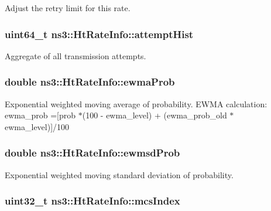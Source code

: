 Adjust the retry limit for this rate. 

\subsubsection[{\texorpdfstring{attempt\+Hist}{attemptHist}}]{\setlength{\rightskip}{0pt plus 5cm}uint64\+\_\+t ns3\+::\+Ht\+Rate\+Info\+::attempt\+Hist}\hypertarget{structns3_1_1HtRateInfo_aa96f3d46e3b1fcd1fae461138a8adb3a}{}\label{structns3_1_1HtRateInfo_aa96f3d46e3b1fcd1fae461138a8adb3a}


Aggregate of all transmission attempts. 

\subsubsection[{\texorpdfstring{ewma\+Prob}{ewmaProb}}]{\setlength{\rightskip}{0pt plus 5cm}double ns3\+::\+Ht\+Rate\+Info\+::ewma\+Prob}\hypertarget{structns3_1_1HtRateInfo_a9199564f7081a66b86dd8bedc0d22e58}{}\label{structns3_1_1HtRateInfo_a9199564f7081a66b86dd8bedc0d22e58}
Exponential weighted moving average of probability. E\+W\+MA calculation\+: ewma\+\_\+prob =\mbox{[}prob $\ast$(100 -\/ ewma\+\_\+level) + (ewma\+\_\+prob\+\_\+old $\ast$ ewma\+\_\+level)\mbox{]}/100 
\subsubsection[{\texorpdfstring{ewmsd\+Prob}{ewmsdProb}}]{\setlength{\rightskip}{0pt plus 5cm}double ns3\+::\+Ht\+Rate\+Info\+::ewmsd\+Prob}\hypertarget{structns3_1_1HtRateInfo_a87a212e1f1d780658899eb9a26be4e44}{}\label{structns3_1_1HtRateInfo_a87a212e1f1d780658899eb9a26be4e44}


Exponential weighted moving standard deviation of probability. 

\subsubsection[{\texorpdfstring{mcs\+Index}{mcsIndex}}]{\setlength{\rightskip}{0pt plus 5cm}uint32\+\_\+t ns3\+::\+Ht\+Rate\+Info\+::mcs\+Index}\hypertarget{structns3_1_1HtRateInfo_af40711b19c3d3cad63d895f0dab2ea13}{}\label{structns3_1_1HtRateInfo_af40711b19c3d3cad63d895f0dab2ea13}



